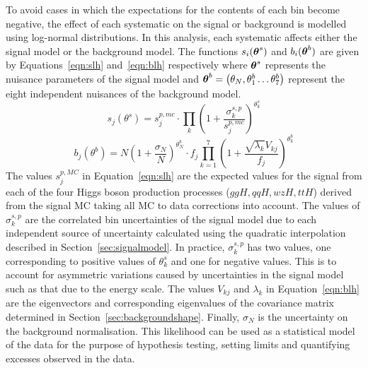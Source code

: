 To avoid cases in which the expectations for the contents of each bin become negative, the effect
of each systematic on the signal or background is modelled using log-normal distributions.
In this analysis, each systematic affects either the signal model or the background model.
The functions $s_{i}({{\boldsymbol{\theta}}^{s}})$ and $b_{i}({{\boldsymbol{\theta}}^{b}})$ are given by 
Equations~\ref{eqn:slh} and~\ref{eqn:blh} respectively where 
$ {\boldsymbol{\theta}}^{s}$ %
represents the nuisance parameters of the signal model and
${\boldsymbol{\theta}}^{b}=\left( \theta_{N},\theta^{b}_{1}\ldots\theta^{b}_{7} \right)$ 
represent the eight independent nuisances of the background model. 
\begin{equation}
s_{j}({\theta}^{s})  =  s_{j}^{p,mc} \cdot \prod_{k} \left(1+\frac{\displaystyle \sigma^{s,p}_{k} }{\displaystyle s_{j}^{p,mc}}\right)^{\theta^{s}_{k}}
\label{eqn:slh}
\end{equation}
\begin{equation}
b_{j}({\theta^{b}}) = N\left(1+\frac{\displaystyle \sigma_{N}}{\displaystyle N}\right)^{\theta^{b}_{N}} \cdot f_{j}
\prod_{k=1}^{7} \left(1+\frac{\displaystyle \sqrt{\lambda_{k}}V_{kj} }{ \displaystyle f_{j}}\right)^{\theta^{b}_{k}}
\label{eqn:blh}
\end{equation}
The values $s_{j}^{p,MC}$ in Equation~\ref{eqn:slh} are the expected values for the signal from
each of the four Higgs boson production processes ($ggH,qqH,wzH,ttH$)
derived from the signal MC taking all MC to data corrections into account. The values of $\sigma_{k}^{s,p}$
are the correlated bin uncertainties of the signal model due to each independent source of uncertainty
calculated using the quadratic interpolation described in Section~\ref{sec:signalmodel}.
In practice, $\sigma_{k}^{s,p}$ has two values, one corresponding to positive values of $\theta^{s}_{k}$
and one for negative values. This is to account for asymmetric variations caused by uncertainties 
in the signal model such as that due to the energy scale.
The values $V_{kj}$ and $\lambda_{k}$ in Equation~\ref{eqn:blh} are the eigenvectors
and corresponding eigenvalues of the covariance matrix determined in Section~\ref{sec:backgroundshape}.
Finally, $\sigma_{N}$ is the uncertainty on the background normalisation.
This likelihood can be used as a statistical model of the data for the purpose of hypothesis testing, setting limits and quantifying excesses observed in the data.


